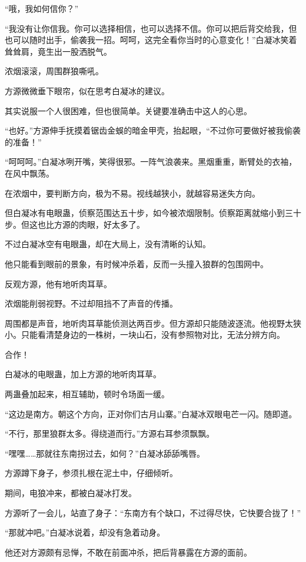 \begin{this_body}
“哦，我如何信你？”

“我没有让你信我。你可以选择相信，也可以选择不信。你可以把后背交给我，但也可以随时出手，偷袭我一招。呵呵，这完全看你当时的心意变化！”白凝冰笑着耸耸肩，竟生出一股洒脱气。

浓烟滚滚，周围群狼嘶吼。

方源微微垂下眼帘，似在思考白凝冰的建议。

其实说服一个人很困难，但也很简单。关键要准确击中这人的心思。

“也好。”方源伸手抚摸着锯齿金蜈的暗金甲壳，抬起眼，“不过你可要做好被我偷袭的准备！”

“呵呵呵。”白凝冰咧开嘴，笑得很邪。一阵气浪袭来。黑烟重重，断臂处的衣袖，在风中飘荡。

在浓烟中，要判断方向，极为不易。视线越狭小，就越容易迷失方向。

但白凝冰有电眼蛊，侦察范围达五十步，如今被浓烟限制。侦察距离就缩小到三十步。但这也比方源的肉眼，好太多了。

不过白凝冰空有电眼蛊，却在大局上，没有清晰的认知。

他只能看到眼前的景象，有时候冲杀着，反而一头撞入狼群的包围网中。

反观方源，他有地听肉耳草。

浓烟能削弱视野。不过却阻挡不了声音的传播。

周围都是声音，地听肉耳草能侦测达两百步。但方源却只能随波逐流。他视野太狭小。只能看清楚身边的一株树，一块山石，没有参照物对比，无法分辨方向。

合作！

白凝冰的电眼蛊，加上方源的地听肉耳草。

两蛊叠加起来，相互辅助，顿时令场面一缓。

“这边是南方。朝这个方向，正对你们古月山寨。”白凝冰双眼电芒一闪。随即道。

“不行，那里狼群太多。得绕道而行。”方源右耳参须飘飘。

“嘿嘿……那就往东南拐过去，如何？”白凝冰舔舔嘴唇。

方源蹲下身子，参须扎根在泥土中，仔细倾听。

期间，电狼冲来，都被白凝冰打发。

方源听了一会儿，站直了身子：“东南方有个缺口，不过得尽快，它快要合拢了！”

“那就冲吧。”白凝冰说着，却没有急着动身。

他还对方源颇有忌惮，不敢在前面冲杀，把后背暴露在方源的面前。


\end{this_body}
